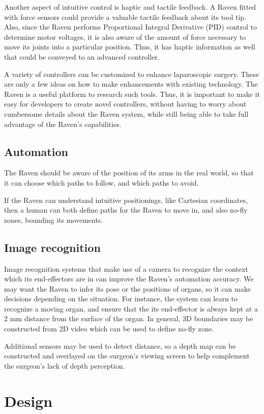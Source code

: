 \documentclass[letterpaper,twocolumn,10pt]{article}
\begin{document}
Another aspect of intuitive control is haptic and tactile feedback. A
Raven fitted with force sensors could provide a valuable tactile
feedback about its tool tip. Also, since the Raven performs
Proportional Integral Derivative (PID) control to determine motor
voltages, it is also aware of the amount of force necessary to move
its joints into a particular position. Thus, it has haptic information
as well that could be conveyed to an advanced controller.

A variety of controllers can be customized to enhance laparoscopic
surgery. These are only a few ideas on how to make enhancements with
existing technology. The Raven is a useful platform to research such
tools. Thus, it is important to make it easy for developers to create
novel controllers, without having to worry about cumbersome details
about the Raven system, while still being able to take full advantage
of the Raven's capabilities.

\subsection{Automation}
The Raven should be aware of the position of its arms in the real 
world, so that it can choose which paths to follow, and which paths 
to avoid.

If the Raven can understand intuitive positionings, like Cartesian 
coordinates, then a human can both define paths for the Raven to move 
in, and also no-fly zones, bounding its movements. 

\subsection{Image recognition}
Image recognition systems that make use of a camera to recognize the
context which its end-effectors are in can improve the Raven's
automation accuracy. We may want the Raven to infer its pose or the
positions of organs, so it can make decisions depending on the
situation. For instance, the system can learn to recognize a moving
organ, and ensure that the its end-effector is always kept at a 2 mm
distance from the surface of the organ. In general, 3D boundaries may
be constructed from 2D video which can be used to define no-fly zone.

Additional sensors may be used to detect distance, so a depth map
can be constructed and overlayed on the surgeon's viewing screen to
help complement the surgeon's lack of depth perception.

\section{Design}
\end{document}
